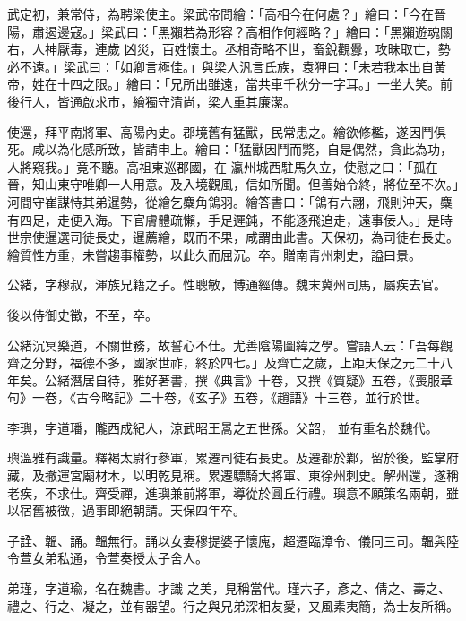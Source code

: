 \begin{pinyinscope}
 武定初，兼常侍，為聘梁使主。梁武帝問繪：「高相今在何處？」繪曰：「今在晉陽，肅遏邊寇。」梁武曰：「黑獺若為形容？高相作何經略？」繪曰：「黑獺遊魂關右，人神厭毒，連歲
 凶災，百姓懷土。丞相奇略不世，畜銳觀釁，攻昧取亡，勢必不遠。」梁武曰：「如卿言極佳。」與梁人汎言氏族，袁狎曰：「未若我本出自黃帝，姓在十四之限。」繪曰：「兄所出雖遠，當共車千秋分一字耳。」一坐大笑。前後行人，皆通啟求市，繪獨守清尚，梁人重其廉潔。



 使還，拜平南將軍、高陽內史。郡境舊有猛獸，民常患之。繪欲修檻，遂因鬥俱死。咸以為化感所致，皆請申上。繪曰：「猛獸因鬥而斃，自是偶然，貪此為功，人將窺我。」竟不聽。高祖東巡郡國，在
 瀛州城西駐馬久立，使慰之曰：「孤在晉，知山東守唯卿一人用意。及入境觀風，信如所聞。但善始令終，將位至不次。」河間守崔謀恃其弟暹勢，從繪乞麋角鴒羽。繪答書曰：「鴒有六翮，飛則沖天，麋有四足，走便入海。下官膚體疏懶，手足遲鈍，不能逐飛追走，遠事佞人。」是時世宗使暹選司徒長史，暹薦繪，既而不果，咸謂由此書。天保初，為司徒右長史。繪質性方重，未嘗趨事權勢，以此久而屈沉。卒。贈南青州刺史，謚曰景。



 公緒，字穆叔，渾族兄籍之子。性聰敏，博通經傳。魏末冀州司馬，屬疾去官。



 後以侍御史徵，不至，卒。



 公緒沉冥樂道，不關世務，故誓心不仕。尤善陰陽圖緯之學。嘗語人云：「吾每觀齊之分野，福德不多，國家世祚，終於四七。」及齊亡之歲，上距天保之元二十八年矣。公緒潛居自待，雅好著書，撰《典言》十卷，又撰《質疑》五卷，《喪服章句》一卷，《古今略記》二十卷，《玄子》五卷，《趙語》十三卷，並行於世。



 李璵，字道璠，隴西成紀人，涼武昭王暠之五世孫。父韶，
 並有重名於魏代。



 璵溫雅有識量。釋褐太尉行參軍，累遷司徒右長史。及遷都於鄴，留於後，監掌府藏，及撤運宮廟材木，以明乾見稱。累遷驃騎大將軍、東徐州刺史。解州還，遂稱老疾，不求仕。齊受禪，進璵兼前將軍，導從於圓丘行禮。璵意不願策名兩朝，雖以宿舊被徵，過事即絕朝請。天保四年卒。



 子詮、韞、誦。韞無行。誦以女妻穆提婆子懷廆，超遷臨漳令、儀同三司。韞與陸令萱女弟私通，令萱奏授太子舍人。



 弟瑾，字道瑜，名在魏書。才識
 之美，見稱當代。瑾六子，彥之、倩之、壽之、禮之、行之、凝之，並有器望。行之與兄弟深相友愛，又風素夷簡，為士友所稱。




\end{pinyinscope}
